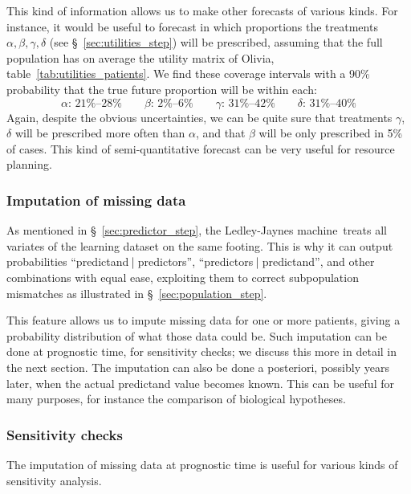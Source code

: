 \documentclass[utf8]{FrontiersinHarvard} %
\newcommand*{\sect}{\S}%
\renewcommand*{\|}[1][]{\nonscript\:#1\vert\nonscript\:\mathopen{}}
\newcommand*{\ljm}{Ledley-Jaynes machine}
\begin{document}
This kind of information allows us to make other forecasts of various kinds. For instance, it would be useful to forecast in which proportions the treatments $\alpha,\beta,\gamma,\delta$ (see \sect~\ref{sec:utilities_step}) will be prescribed, assuming that the full population has on average the utility matrix of Olivia, table~\ref{tab:utilities_patients}. We find these coverage intervals with a 90\% probability that the true future proportion will be within each:
\begin{equation}
  \label{eq:ranges_future_treatments}
  \alpha\text{: 21\%--28\%}\qquad
  \beta\text{: 2\%--6\%}\qquad
  \gamma\text{: 31\%--42\%}\qquad
  \delta\text{: 31\%--40\%}
\end{equation}
Again, despite the obvious uncertainties, we can be quite sure that treatments $\gamma$, $\delta$ will be prescribed more often than $\alpha$, and that $\beta$ will be only prescribed in 5\% of cases. This kind of semi-quantitative forecast can be very useful for resource planning.

\subsubsection{Imputation of missing data}
\label{sec:missing_data}

As mentioned in \sect~\ref{sec:predictor_step}, the \ljm\ treats all variates of the learning dataset on the same footing. This is why it can output probabilities \enquote{predictand$\|$predictors}, \enquote{predictors$\|$predictand}, and other combinations with equal ease, exploiting them to correct subpopulation mismatches as illustrated in \sect~\ref{sec:population_step}.

This feature allows us to impute missing data for one or more patients, giving a probability distribution of what those data could be. Such imputation can be done at prognostic time, for sensitivity checks; we discuss this more in detail in the next section. The imputation can also be done a posteriori, possibly years later, when the actual predictand value becomes known. This can be useful for many purposes, for instance the comparison of biological hypotheses.


\subsubsection{Sensitivity checks}
\label{sec:sensitivity}

The imputation of missing data at prognostic time is useful for various kinds of sensitivity analysis.
\end{document}
